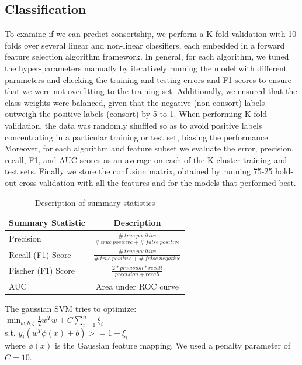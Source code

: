 \documentclass[twoside,twocolumn,paper=letter,fontsize=11pt]{article}
\begin{document}
\subsection{Classification}
To examine if we can predict consortship, we perform a K-fold validation with 10
folds over several linear and non-linear classifiers, each embedded in a forward
feature selection algorithm framework. In general, for each algorithm, we tuned
the hyper-parameters manually by iteratively running the model with different
parameters and checking the training and testing errors and F1 scores to ensure
that we were not overfitting to the training set.  Additionally, we ensured that
the class weights were balanced, given that the negative (non-consort) labels
outweigh the positive labels (consort) by 5-to-1. When performing K-fold
validation, the data was randomly shuffled so as to avoid positive labels
concentrating in a particular training or test set, biasing the performance.
Moreover, for each algorithm and feature subset we evaluate the error,
precision, recall, F1, and AUC scores as an average on
each of the K-cluster training and test sets.  Finally we store the confusion
matrix, obtained by running 75-25 hold-out cross-validation with all the
features and for the models that performed best.
\begin{table}[h]
  \centering
  \begin{tabular}{|l|c|}
    \hline
    Summary Statistic & Description \\
    \hline
    Precision&
    $\frac{\#\ true\ positive}{\#\ true\ positive + \#\ false\ positive}$\\
    \hline
    Recall (F1) Score &
    $\frac{\#\ true\ positive}{\#\ true\ positive + \#\ false\ negative}$\\
    \hline
    Fischer (F1) Score &
    $\frac{2* precision* recall}{{precision}+{recall}}$\\
    \hline
    AUC &
    Area under ROC curve \\
    \hline
  \end{tabular}
  \caption{Description of summary statistics}
  \label{tbl:sum_stats}
\end{table}

 The gaussian SVM tries to optimize: \\
 $ \min_{w,b,\xi} \frac{1}{2} w^Tw + C \sum_{i=1}^{n} \xi_i$\\ s.t. $ y_i(w^T\phi(x) + b) >= 1-\xi_i$\\ where $\phi(x)$ is the Gaussian feature mapping.
We used a penalty parameter of
$C=10$.\\
\end{document}
